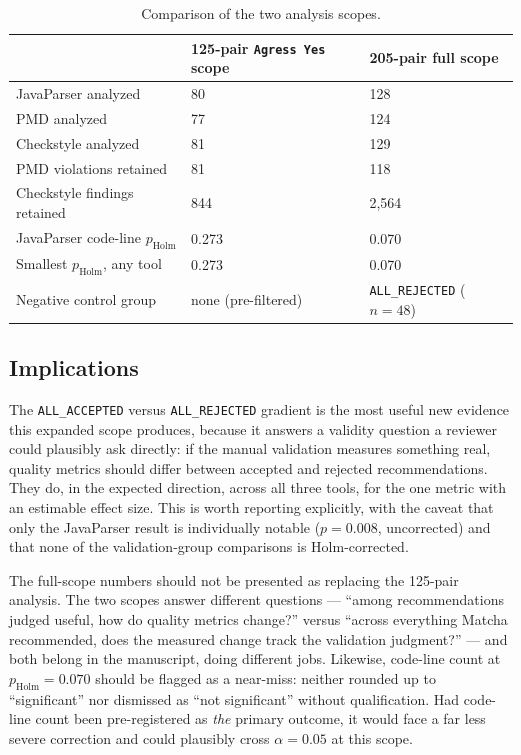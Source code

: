 \begin{table}[htbp]
\centering
\caption{Comparison of the two analysis scopes.}
\label{tab:ba-full-scope-comparison}
\small
\begin{tabular}{lll}
\toprule
& 125-pair \texttt{Agress Yes} scope & 205-pair full scope \\
\midrule
JavaParser analyzed & 80 & 128 \\
PMD analyzed        & 77 & 124 \\
Checkstyle analyzed & 81 & 129 \\
PMD violations retained    & 81  & 118 \\
Checkstyle findings retained & 844 & 2{,}564 \\
JavaParser code-line $p_{\text{Holm}}$ & 0.273 & 0.070 \\
Smallest $p_{\text{Holm}}$, any tool   & 0.273 & 0.070 \\
Negative control group & none (pre-filtered) & \texttt{ALL\_REJECTED} ($n=48$) \\
\bottomrule
\end{tabular}
\end{table}

\subsection{Implications}
\label{sec:ba-full-implications}

The \texttt{ALL\_ACCEPTED} versus \texttt{ALL\_REJECTED} gradient is the most useful new evidence this expanded scope produces, because it answers a validity question a reviewer could plausibly ask directly: if the manual validation measures something real, quality metrics should differ between accepted and rejected recommendations.
They do, in the expected direction, across all three tools, for the one metric with an estimable effect size.
This is worth reporting explicitly, with the caveat that only the JavaParser result is individually notable ($p=0.008$, uncorrected) and that none of the validation-group comparisons is Holm-corrected.

The full-scope numbers should not be presented as replacing the 125-pair analysis.
The two scopes answer different questions --- ``among recommendations judged useful, how do quality metrics change?'' versus ``across everything Matcha recommended, does the measured change track the validation judgment?'' --- and both belong in the manuscript, doing different jobs.
Likewise, code-line count at $p_{\text{Holm}}=0.070$ should be flagged as a near-miss: neither rounded up to ``significant'' nor dismissed as ``not significant'' without qualification.
Had code-line count been pre-registered as \emph{the} primary outcome, it would face a far less severe correction and could plausibly cross $\alpha=0.05$ at this scope.

